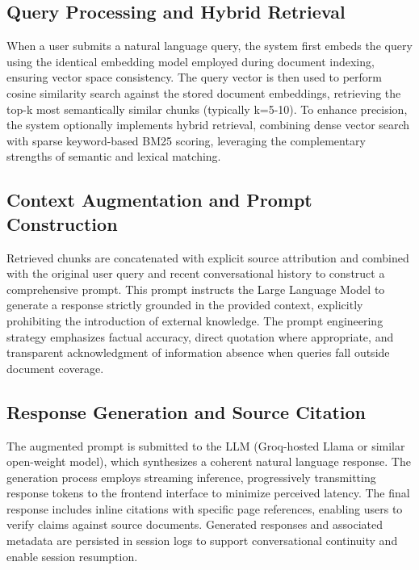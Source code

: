 \subsection{Query Processing and Hybrid Retrieval}

When a user submits a natural language query, the system first embeds the query using the identical embedding model employed during document indexing, ensuring vector space consistency. The query vector is then used to perform cosine similarity search against the stored document embeddings, retrieving the top-k most semantically similar chunks (typically k=5-10). To enhance precision, the system optionally implements hybrid retrieval, combining dense vector search with sparse keyword-based BM25 scoring, leveraging the complementary strengths of semantic and lexical matching.

\subsection{Context Augmentation and Prompt Construction}

Retrieved chunks are concatenated with explicit source attribution and combined with the original user query and recent conversational history to construct a comprehensive prompt. This prompt instructs the Large Language Model to generate a response strictly grounded in the provided context, explicitly prohibiting the introduction of external knowledge. The prompt engineering strategy emphasizes factual accuracy, direct quotation where appropriate, and transparent acknowledgment of information absence when queries fall outside document coverage.

\subsection{Response Generation and Source Citation}

The augmented prompt is submitted to the LLM (Groq-hosted Llama or similar open-weight model), which synthesizes a coherent natural language response. The generation process employs streaming inference, progressively transmitting response tokens to the frontend interface to minimize perceived latency. The final response includes inline citations with specific page references, enabling users to verify claims against source documents. Generated responses and associated metadata are persisted in session logs to support conversational continuity and enable session resumption.


